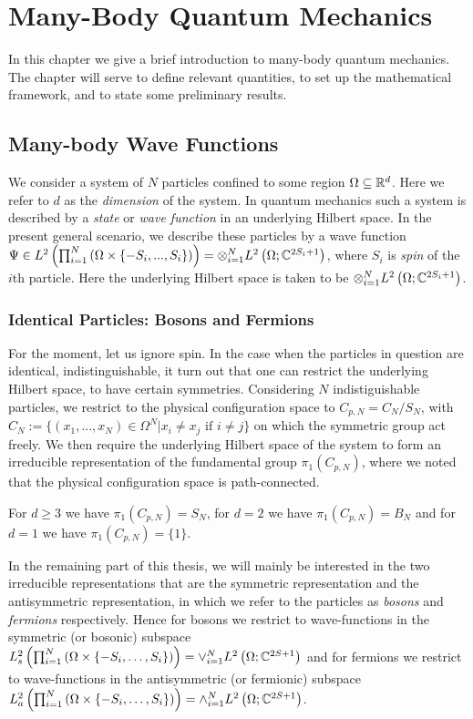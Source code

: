 \chapter{Many-Body Quantum Mechanics}
	In this chapter we give a brief introduction to many-body quantum mechanics. The chapter will serve to define relevant quantities, to set up the mathematical framework, and to state some preliminary results.

\section{Many-body Wave Functions}
	We consider a system of $N$ particles confined to some region $ \Omega\subseteq \mathbb{R}^d $. Here we refer to $ d $ as the \emph{dimension} of the system. In quantum mechanics such a system is described by a \emph{state} or \emph{wave function} in an underlying Hilbert space. In the present general scenario, we describe these particles by a wave function $ \Psi\in L^2\left(\prod_{i=1}^{N}\left(\Omega\times \{-S_i,...,S_i\}\right) \right)=\otimes_{i=1}^{N}L^2\left(\Omega;\mathbb{C}^{2S_i+1}\right) $, where $ S_i $ is \emph{spin} of the $ i $th particle. Here the underlying Hilbert space is taken to be $ \otimes_{i=1}^{N}L^2\left(\Omega;\mathbb{C}^{2S_i+1}\right) $.
	\subsection{Identical Particles: Bosons and Fermions}
		For the moment, let us ignore spin. In the case when the particles in question are identical, \ie indistinguishable, it turn out that one can restrict the underlying Hilbert space, to have certain symmetries. Considering $ N $ indistiguishable particles, we restrict to the physical configuration space to $ C_{p,N}=C_N/S_N $, with $ C_N:=\{(x_1,...,x_N)\in \Omega^N \vert x_i\neq x_j \text{ if }i\neq j\} $ on which the symmetric group act freely. We then require the underlying Hilbert space of the system to form an irreducible representation of the fundamental group $\pi_1(C_{p,N})$, where we noted that the physical configuration space is path-connected.
		\begin{remark}
			For $ d\geq 3 $ we have $\pi_1(C_{p,N})=S_N$, for $ d=2 $ we have $\pi_1(C_{p,N})=B_N$ and for $d=1$ we have $\pi_1(C_{p,N})=\{1\}$.
		\end{remark}
		In the remaining part of this thesis, we will mainly be interested in the two irreducible representations that are the symmetric representation and the antisymmetric representation, in which we refer to the particles as \emph{bosons} and \emph{fermions} respectively. Hence for bosons we restrict to wave-functions in the symmetric (or bosonic) subspace $ L^2_{s}\left(\prod_{i=1}^{N}\left(\Omega\times \{-S_i,\ldots,S_i\}\right) \right)=\vee_{i=1}^{N}L^2\left(\Omega; \mathbb{C}^{2S+1}\right)$ and for fermions we restrict to wave-functions in the antisymmetric (or fermionic) subspace $ L^2_{a}\left(\prod_{i=1}^{N}\left(\Omega\times \{-S_i,\ldots,S_i\}\right) \right)=\wedge_{i=1}^{N}L^2\left(\Omega; \mathbb{C}^{2S+1}\right)$.